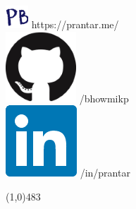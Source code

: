 \documentclass[10pt,oneside]{article}
\begin{document}
        \noindent
        \makebox[\textwidth][c]{}%
        \begin{flushright}
            \vspace*{-3.5mm}
            \includegraphics[scale=0.5]{icon}
            https://prantar.me/\\
            \includegraphics[scale=0.25]{github}
            /bhowmikp\\
            \includegraphics[scale=0.25]{linkedin}
            /in/prantar\\
        \end{flushright}
        \line(1,0){483}
        
\end{document}
